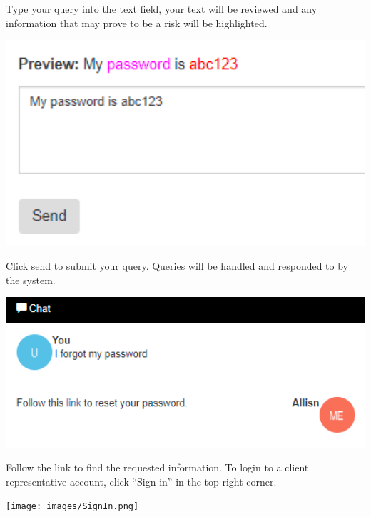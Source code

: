 \documentclass[11pt]{article}
\begin{document}
\begin{flushleft}
	Type your query into the text field, your text will be reviewed and any information that may prove to be a risk will be highlighted.
\end{flushleft}
\includegraphics[width=1.0\textwidth]{images/Preview.png}

\begin{flushleft}
	Click send to submit your query. Queries will be handled and responded to by the system.
\end{flushleft}
\includegraphics[width=1.0\textwidth]{images/Response.png}

\begin{flushleft}
	Follow the link to find the requested information.
	To login to a client representative account, click “Sign in” in the top right corner.
\end{flushleft}
\texttt{[image: images/SignIn.png]}
\end{document}
